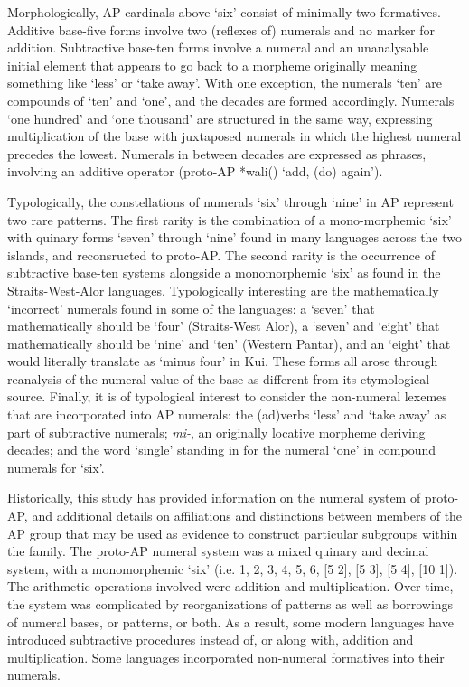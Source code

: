 Morphologically, AP cardinals above `six' consist of minimally two formatives. Additive base-five forms involve two (reflexes of) numerals and no marker for addition. Subtractive base-ten forms involve a numeral and an unanalysable initial element that appears to go back to a morpheme originally meaning something like `less' or `take away'. With one exception, the numerals `ten' are compounds of `ten' and `one', and the decades are formed accordingly. Numerals `one hundred' and `one thousand' are structured in the same way, expressing multiplication of the base with juxtaposed numerals in which the highest numeral precedes the lowest. Numerals in between decades are expressed as phrases, involving an additive operator (proto-AP *wali({\ng}) `add, (do) again'). 

Typologically, the constellations of numerals `six' through `nine' in AP represent two rare patterns. The first rarity is the combination of a mono-morphemic `six' with quinary forms `seven' through `nine' found in many languages across the two islands, and reconsructed to proto-AP. The second rarity is the occurrence of subtractive base-ten systems alongside a monomorphemic `six' as found in the Straits-West-Alor languages. Typologically interesting are the mathematically `incorrect' numerals found in some of the languages: a `seven' that mathematically should be `four' (Straits-West Alor), a `seven' and `eight' that mathematically should be `nine' and `ten' (Western Pantar), and an `eight' that would literally translate as `minus four' in Kui. These forms all arose through reanalysis of the numeral value of the base as different from its etymological source. Finally, it is of typological interest to consider the non-numeral lexemes that are incorporated into AP numerals: the (ad)verbs `less' and `take away' as part of subtractive numerals;      \textit{mi-}, an originally locative morpheme deriving decades; and the word `single' standing in for the numeral `one' in compound numerals for `six'. 

Historically, this study has provided information on the numeral system of proto-AP, and additional details on affiliations and distinctions between members of the AP group that may be used as evidence to construct particular subgroups within the family. The proto-AP numeral system was a mixed quinary and decimal system, with a monomorphemic `six' (i.e. 1, 2, 3, 4, 5, 6, [5 2], [5 3], [5 4], [10 1]). The arithmetic operations involved were addition and multiplication. Over time, the system was complicated by reorganizations of patterns as well as borrowings of numeral bases, or patterns, or both. As a result, some modern languages have introduced subtractive procedures instead of, or along with, addition and multiplication. Some languages incorporated non-numeral formatives into their numerals. 


